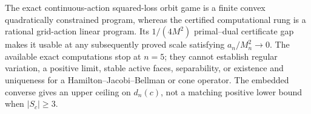 The exact continuous-action squared-loss orbit game is a finite convex quadratically constrained program, whereas the certified computational rung is a rational grid-action linear program.  Its \(1/(4M^2)\) primal--dual certificate gap makes it usable at any subsequently proved scale satisfying \(a_n/M_n^2\to0\).  The available exact computations stop at \(n=5\); they cannot establish regular variation, a positive limit, stable active faces, separability, or existence and uniqueness for a Hamilton--Jacobi--Bellman or cone operator.  The embedded converse gives an upper ceiling on \(d_n(c)\), not a matching positive lower bound when \(|S_c|\geq3\).
